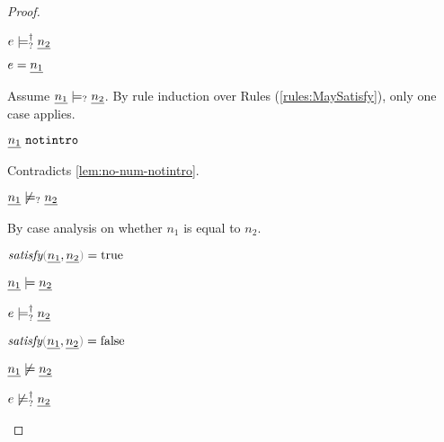 \begin{proof}
\begin{byCases}
\begin{byCases}
\begin{pfsteps*}
        \item $e \models_{?}^{\dag} \underline{n_2}$  
        \end{pfsteps*}
    \item[\text{(\ref{rule:TNum})}]
        \begin{pfsteps*}
        \item $e=\underline{n_1}$ 
        \end{pfsteps*}
        Assume $\underline{n_1} \models_{?} \underline{n_2}$. By rule induction over Rules (\ref{rules:MaySatisfy}), only one case applies.
        \begin{byCases}
        \item[\text{(\ref{rule:CMSNotIntro})}]
            \begin{pfsteps*}
            \item $\underline{n_1} ~\mathtt{notintro}$ 
            \end{pfsteps*}
            Contradicts \autoref{lem:no-num-notintro}.
        \end{byCases}
        \begin{pfsteps*}
        \item $\underline{n_1} \not\models_{?} \underline{n_2}$  
        \end{pfsteps*}
        By case analysis on whether $n_1$ is equal to $n_2$.
        \begin{byCases}
        \item[n_1=n_2]
            \begin{pfsteps*}
            \item $\fsatisfy{\hnum{n_1}}{\cnum{n_2}}=\true$  
            \item $\underline{n_1} \models \underline{n_2}$  
            \item $e \models_{?}^{\dag} \underline{n_2}$  
            \end{pfsteps*}
        \item[n_1\neq n_2]
            \begin{pfsteps*}
            \item $\fsatisfy{\hnum{n_1}}{\cnum{n_2}}=\false$  
            \item $\underline{n_1} \not\models \underline{n_2}$  
            \item $e \not\models_{?}^{\dag} \underline{n_2}$  
            \end{pfsteps*}
        \end{byCases}
    \end{byCases}
 

\end{byCases}
\end{proof}

